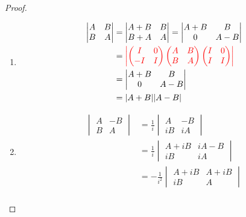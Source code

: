 \documentclass[twoside,openright]{book}
\begin{document}
\begin{CJK*}{UTF8}{}
\begin{proof}
\begin{enumerate}
\item
\begin{align*}
\begin{vmatrix}
A & B \\
B & A
\end{vmatrix}
&=
\begin{vmatrix}
A+B & B \\
B+A & A
\end{vmatrix}
=
\begin{vmatrix} A+B & B \\ 0 & A-B \end{vmatrix} \\
&=
{\color{red}
\begin{vmatrix}
\begin{pmatrix} I & 0 \\ -I & I \end{pmatrix}
\begin{pmatrix} A & B \\ B & A \end{pmatrix}
\begin{pmatrix} I & 0 \\ I & I \end{pmatrix}
\end{vmatrix}} \\
&=
\begin{vmatrix} A+B & B \\ 0 & A-B \end{vmatrix} \\
&=
\lvert{A + B}\rvert\lvert{A-B}\rvert
\end{align*}
\item
\begin{align*}
\begin{vmatrix}
A & -B \\
B & A
\end{vmatrix}&=\frac{1}{i}\begin{vmatrix}
A & -B \\
iB & iA
\end{vmatrix} \\
&=
\frac{1}{i}\begin{vmatrix}
A+iB & iA-B \\
iB & iA
\end{vmatrix}\\
&=-\frac{1}{i^2}\begin{vmatrix}
A+iB & A+iB \\
iB & A
\end{vmatrix}\\

\end{align*}
\end{enumerate}
\end{proof}
\end{CJK*}
\end{document}
